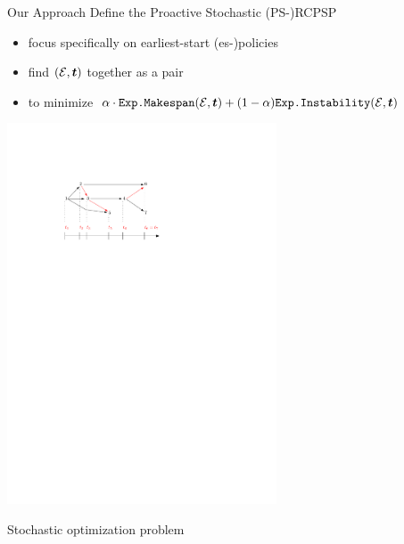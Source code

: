 \begin{frame}{Our Approach} 
Define the Proactive Stochastic (PS-)RCPSP
\begin{itemize}
	\item focus specifically on earliest-start (es-)policies
	\item find $(\mathcal{E}, \boldsymbol t)$ together as a pair
	\item to minimize $\alpha \cdot \texttt{Exp.Makespan}(\mathcal{E},\boldsymbol t) + (1-\alpha) \texttt{Exp.Instability}(\mathcal{E},\boldsymbol t)$
\end{itemize}

\medskip

\begin{center}
	\includegraphics[width=0.6\textwidth]{fig-sol2}
\end{center}

\medskip
Stochastic optimization problem

\end{frame}

